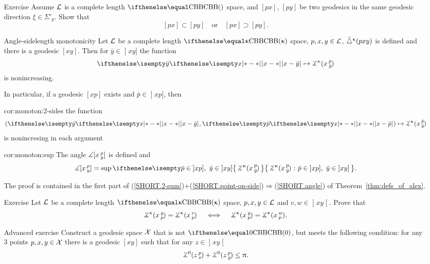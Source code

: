 \begin{thm}{Exercise}\label{ex:cbb-geod-overlap}
Assume $\mathcal{L}$ is a complete length $\Alex{}$ space, and $[px]$, $[py]$ be two geodesics  in the same geodesic direction $\xi\in \Sigma'_p$.
Show that 
\[[px]\subset [py]\quad \text{or}\quad [px]\supset [py].\]

\end{thm}

\begin{thm}{Angle-sidelength  monotonicity}\label{cor:monoton} 
Let $\mathcal{L}$ be a complete length $\Alex{\kappa}$ space,
$p,x,y\in \spc{L}$,
${\tilde\triangle}^{\upkappa}(p x y)$ is defined
and there is a geodesic $[xy]$.
Then for $\bar y\in\mathopen{]}xy]$ the function 
\[\dist{x}{\bar y}{}\mapsto \angk\kappa x p{\bar y}\] 
is nonincreasing.

In particular, if a geodesic $[x p]$ exists and $\bar p\in \mathopen{]}x p]$, then
\begin{subthm}{cor:monoton:2-sides}
the function 
\[(\dist{x}{\bar y}{},\dist{x}{\bar p}{})\mapsto \angk\kappa x {\bar p}{\bar y}\] is nonincresing in each argument
\end{subthm}
 
\begin{subthm}{cor:monoton:sup}
The angle $\measuredangle[x\,{}^{p}_{y}]$ is defined and 
\[\mangle\hinge{x}{p}{y}
=
\sup\set{\angk\kappa x {\bar p}{\bar y}}{
\bar p\in\mathopen{]}xp],\ 
\bar y\in\mathopen{]}xy]}.\]

\end{subthm}
\end{thm}

The proof is contained in the first part of (\ref{SHORT.2-sum})$+$(\ref{SHORT.point-on-side})$\Rightarrow$(\ref{SHORT.angle}) of Theorem~\ref{thm:defs_of_alex}.

\begin{thm}{Exercise}\label{ex:equality-alexlemma} 
Let $\mathcal{L}$ be a complete length $\Alex{\kappa}$ space,
$p,x,y\in \spc{L}$
and $v,w\in \mathopen{]}xy\mathclose{[}$.
Prove that  
\[
\angk\kappa xyp=\angk\kappa xvp
\quad \iff\quad 
\angk\kappa xyp=\angk\kappa xwp.
\]

\end{thm}

\begin{thm}{Advanced exercise} \label{ex:urysohn}
Construct a geodesic space $\mathcal{X}$ that is not $\Alex0$, 
but meets the following condition: for any 3 points $p,x,y\in \spc{X}$ there is a geodesic $[x y]$ such that for any $z\in \mathopen{]}x y\mathclose{[}$
\[\angk{0}{z}{p}{x}+\angk{0}{z}{p}{y}
\le
\pi.\]
\end{thm}

